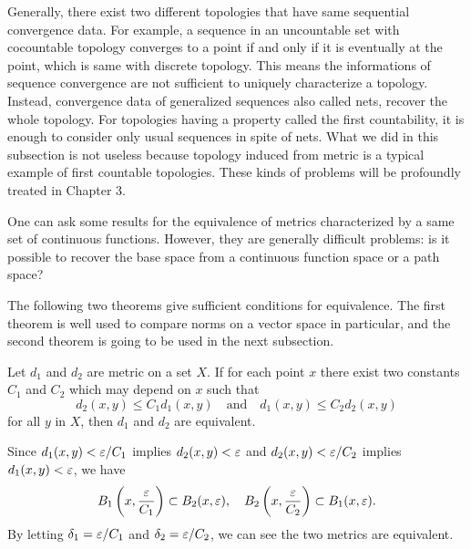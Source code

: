 \documentclass{../crs}
\begin{document}
\begin{rmk}
Generally, there exist two different topologies that have same sequential convergence data.
For example, a sequence in an uncountable set with cocountable topology converges to a point if and only if it is eventually at the point, which is same with discrete topology.
This means the informations of sequence convergence are not sufficient to uniquely characterize a topology.
Instead, convergence data of generalized sequences also called nets, recover the whole topology.
For topologies having a property called the first countability, it is enough to consider only usual sequences in spite of nets.
What we did in this subsection is not useless because topology induced from metric is a typical example of first countable topologies.
These kinds of problems will be profoundly treated in Chapter 3.
\end{rmk}
\begin{rmk}
One can ask some results for the equivalence of metrics characterized by a same set of continuous functions.
However, they are generally difficult problems: is it possible to recover the base space from a continuous function space or a path space?
\end{rmk}


The following two theorems give sufficient conditions for equivalence.
The first theorem is well used to compare norms on a vector space in particular, and the second theorem is going to be used in the next subsection.

\begin{thm}\label{thm:equivalent metrics}
Let $d_1$ and $d_2$ are metric on a set $X$.
If for each point $x$ there exist two constants $C_1$ and $C_2$ which may depend on $x$ such that
\[d_2(x,y)\le C_1d_1(x,y)\quad\text{and}\quad d_1(x,y)\le C_2d_2(x,y)\]
for all $y$ in $X$, then $d_1$ and $d_2$ are equivalent.
\end{thm}
\begin{pf}
Since $d_1(x,y)<\varepsilon/C_1$ implies $d_2(x,y)<\varepsilon$ and $d_2(x,y)<\varepsilon/C_2$ implies $d_1(x,y)<\varepsilon$, we have
\[B_1\left(x,\frac{\varepsilon}{C_1}\right)\subset B_2(x,\varepsilon),\quad B_2\left(x,\frac{\varepsilon}{C_2}\right)\subset B_1(x,\varepsilon).\]
By letting $\delta_1=\varepsilon/C_1$ and $\delta_2=\varepsilon/C_2$, we can see the two metrics are equivalent.
\end{pf}
\end{document}
